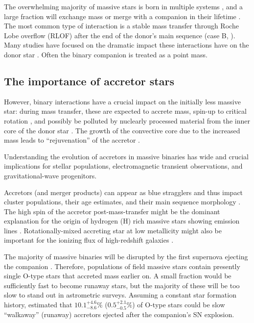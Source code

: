 \documentclass[twocolumn,twocolappendix,trackchanges]{aastex63}
\newcommand{\todo}[1]{{\large $\blacksquare$~\textbf{\color{red}[#1]}}~$\blacksquare$}
\begin{document}
The overwhelming majority of massive stars is born in multiple systems
\citep[e.g.,][]{mason:09, almeida:17}, and a large fraction will
exchange mass or merge with a companion in their lifetime
\citep[e.g.,][]{sana:12}. The most common type of interaction is a
stable mass transfer through Roche Lobe overflow (RLOF) after the end of the donor's main sequence (case
B, \citealt{kippenhahn:67}).  Many
studies %
have focused on the dramatic impact these interactions have on the
donor star \citep[e.g.,][]{morton:60, yoon:17, gotberg:17, gotberg:18, laplace:20,
  laplace:21, blagorodnova:21}. Often the binary companion is treated as a point mass.

\subsection{The importance of accretor stars}

However, binary interactions have a crucial impact on the initially
less massive star: %
during mass transfer, these are expected to
accrete mass, spin-up to critical rotation
\citep[e.g.,][]{packet:81}, and possibly be polluted by
nuclearly processed material from the inner core of the donor star
\citep[e.g.,][]{blaauw:93}. The growth of
the convective core due to the increased mass leads to
``rejuvenation'' of the accretor \citep[e.g.,][]{neo:77, schneider:16}.

Understanding the evolution of accretors in massive binaries has wide
and crucial implications for stellar populations, electromagnetic
transient observations, and gravitational-wave progenitors.

Accretors
(and merger products) can appear as blue stragglers \citep[e.g.,][]{chen:09, chen:10} and thus impact cluster
populations, their age estimates, and their main sequence morphology
\citep[e.g.,][]{pols_marinus:94, wang:20}. The high spin of the
accretor post-mass-transfer might be the dominant explanation for the origin of
hydrogen (H) rich massive stars showing emission lines \citep[e.g.,][]{bodensteiner:20,
  vinciguerra:20}. Rotationally-mixed accreting
star at low metallicity might also be important for the ionizing flux of high-redshift
galaxies \citep[e.g.,][]{eldridge:12}.

The majority of massive binaries will be
disrupted by the first supernova ejecting the companion
\citep[``binary SN scenario'', ][]{blaauw:61, dedonder:97,
  eldridge:11, boubert:18, renzo:19walk, evans:20}. Therefore,
populations of field massive stars contain presently single O-type
stars that accreted mass earlier on. A small fraction would be
sufficiently fast to become runaway stars, but the majority of these will be too
slow to stand out in astrometric surveys. Assuming a constant star
formation history, \cite{renzo:19walk} estimated that
$10.1^{+4.6}_{-8.6}\%$ ($0.5^{+2.1}_{-0.5}\%$) of O-type stars could
be slow ``walkaway'' (runaway) accretors
ejected after the companion's SN explosion.
\end{document}
